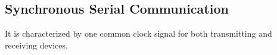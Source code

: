 \subsection{Synchronous Serial Communication }
It is characterized by one common clock signal for both transmitting and receiving devices.